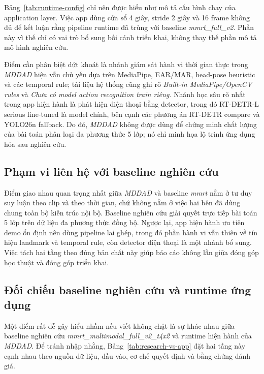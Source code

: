 \documentclass[conference,a4paper]{IEEEtran}
\begin{document}
Bảng~\ref{tab:runtime-config} chỉ nên được hiểu như mô tả cấu hình chạy của application layer. Việc app dùng cửa sổ 4 giây, stride 2 giây và 16 frame không đủ để kết luận rằng pipeline runtime đã trùng với baseline \textit{mmrt\_full\_v2}. Phần này vì thế chỉ có vai trò bổ sung bối cảnh triển khai, không thay thế phần mô tả mô hình nghiên cứu.

Điểm cần phân biệt dứt khoát là nhánh giám sát hành vi thời gian thực trong \textit{MDDAD} hiện vẫn chủ yếu dựa trên MediaPipe, EAR/MAR, head-pose heuristic và các temporal rule; tài liệu hệ thống cũng ghi rõ \textit{Built-in MediaPipe/OpenCV rules} và \textit{Chưa có model action recognition train riêng}. Nhánh học sâu rõ nhất trong app hiện hành là phát hiện điện thoại bằng detector, trong đó RT-DETR-L serious fine-tuned là model chính, bên cạnh các phương án RT-DETR compare và YOLO26n fallback. Do đó, \textit{MDDAD} không được dùng để chứng minh chất lượng của bài toán phân loại đa phương thức 5 lớp; nó chỉ minh họa lộ trình ứng dụng hóa sau nghiên cứu.

\subsection{Phạm vi liên hệ với baseline nghiên cứu}
Điểm giao nhau quan trọng nhất giữa \textit{MDDAD} và baseline \textit{mmrt} nằm ở tư duy suy luận theo clip và theo thời gian, chứ không nằm ở việc hai bên đã dùng chung toàn bộ kiến trúc nội bộ. Baseline nghiên cứu giải quyết trực tiếp bài toán 5 lớp trên dữ liệu đa phương thức đồng bộ. Ngược lại, app hiện hành ưu tiên demo ổn định nên dùng pipeline lai ghép, trong đó phần hành vi vẫn thiên về tín hiệu landmark và temporal rule, còn detector điện thoại là một nhánh bổ sung. Việc tách hai tầng theo đúng bản chất này giúp báo cáo không lẫn giữa đóng góp học thuật và đóng góp triển khai.

\subsection{Đối chiếu baseline nghiên cứu và runtime ứng dụng}
Một điểm rất dễ gây hiểu nhầm nếu viết không chặt là sự khác nhau giữa baseline nghiên cứu \textit{mmrt\_multimodal\_full\_v2\_t4x2} và runtime hiện hành của \textit{MDDAD}. Để tránh nhập nhằng, Bảng~\ref{tab:research-vs-app} đặt hai tầng này cạnh nhau theo nguồn dữ liệu, đầu vào, cơ chế quyết định và bằng chứng đánh giá.
\end{document}
